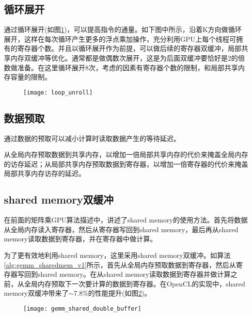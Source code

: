 \subsection{循环展开}
通过循环展开(如图\ref{fig:loop_unroll})，可以提高指令的通量。如下图中所示，沿着K方向做循环展开，这样在每次循环产生更多的浮点乘加操作，充分利用GPU上每个线程可拥有的寄存器个数。并且以循环展开作为前提，可以做后续的寄存器双缓冲，局部共享内存双缓冲等优化。通常都是做偶数次展开，这是为后面双缓冲要恰好是2的倍数做准备。在这里循环展开8次，考虑的因素有寄存器个数的限制，和局部共享内存容量的限制。

\begin{figure}[htbp]
	\centering
	\texttt{[image: loop\_unroll]}
	\label{fig:loop_unroll}
\end{figure}

\subsection{数据预取}
通过数据的预取可以减小计算时读取数据产生的等待延迟。

从全局内存预取数据到共享内存，以增加一倍局部共享内存的代价来掩盖全局内存的访存延迟；从局部共享内存预取数据到寄存器，以增加一倍寄存器的代价来掩盖局部共享内存访存的延迟。

\subsection{shared memory双缓冲}
在前面的矩阵乘GPU算法描述中，讲述了shared memory的使用方法。首先将数据从全局内存读入寄存器，然后从寄存器写回到shared memory，最后再从shared memory读取数据到寄存器，并在寄存器中做计算。

为了更有效地利用shared memory，这里采用shared memory双缓冲。如算法\ref{alg:gemm_sharedmem_v1}所示，首先从全局内存预取数据到寄存器，然后从寄存器写回到shared memory。在从shared memory读取数据到寄存器并做计算之前，从全局内存预取下一次要计算的数据到寄存器。在OpenCL的实现中，shared memory双缓冲带来了$\sim$7.8\%的性能提升(如图\ref{fig:gemm_shared_double_buffer})。
\begin{figure}[htbp]
	\centering
	\texttt{[image: gemm\_shared\_double\_buffer]}
	\label{fig:gemm_shared_double_buffer}
\end{figure}

